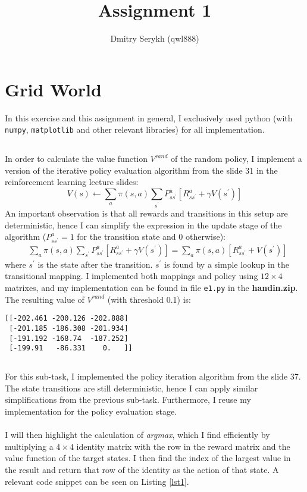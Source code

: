 \documentclass[a4paper]{article}
\title{\vspace{-5cm} Assignment 1}
\author{Dmitry Serykh (qwl888)}
\begin{document}
\maketitle

\section{Grid World}
\label{sec:1}
In this exercise and this assignment in general, I exclusively used python (with
\texttt{numpy}, \texttt{matplotlib} and other relevant libraries) for all
implementation.
\subsection{}
\label{subsec:11}
In order to calculate the value function $V^{rand}$ of the random policy, I
implement a version of the iterative policy evaluation algorithm from the slide
31 in the reinforcement learning lecture slides:
$$
  V(s) \leftarrow \sum_{a} \pi(s, a)
  \sum_{s^{\prime}} P_{s s^{\prime}}^{a}\left[R_{s s^{\prime}}^{a}+\gamma
    V(s^{\prime})\right]
  $$
An important observation is that all rewards and
transitions in this setup are deterministic, hence I can simplify the expression in the update
stage of the algorithm ($P_{s s^{\prime}}^{a} = 1$ for the transition state and
0 otherwise):
\begin{align*}
  &\sum_{a} \pi(s, a) \sum_{s^{\prime}} P_{s s^{\prime}}^{a}\left[R_{s s^{\prime}}^{a}+\gamma
    V(s^{\prime})\right] = 
  \sum_{a} \pi(s, a)
  \left[R_{s s^{\prime}}^{a} + V(s^{\prime})\right]
\end{align*}
where $s^{\prime}$ is the state after the transition. $s^{\prime}$ is found
by a simple lookup in the transitional mapping. I implemented both mappings and policy
using $12\times 4$ matrixes, and my implementation can be found in file \texttt{e1.py} in the
\textbf{handin.zip}. The resulting value of $V^{rand}$ (with threshold 0.1) is:
\begin{verbatim}
[[-202.461 -200.126 -202.888]
 [-201.185 -186.308 -201.934]
 [-191.192 -168.74  -187.252]
 [-199.91   -86.331    0.   ]]
\end{verbatim}

\subsection{}
\label{subsec:12}
For this sub-task, I implemented the policy iteration algorithm
from the slide 37. The state transitions are still deterministic, hence I can
apply similar simplifications from the previous sub-task. Furthermore, I reuse
my implementation for the policy evaluation stage. \\\\
I will then highlight the calculation of \emph{argmax}, which I find
efficiently by multiplying a $4 \times 4$ identity matrix with the row in the
reward matrix and the value function of the target states. I then find the index
of the largest value in the result and return that row of the identity as the
action of that state.
A relevant code snippet can be seen on Listing \ref{lst1}.
\end{document}
